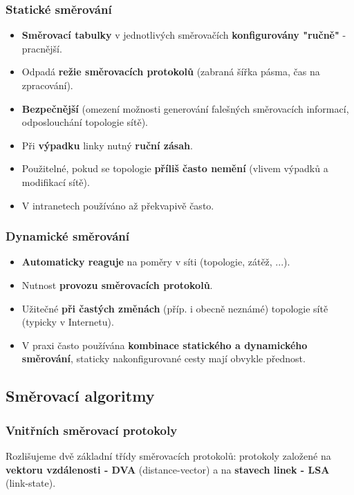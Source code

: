 \subsubsection*{Statické směrování}
\begin{itemize}
\item \textbf{Směrovací tabulky} v jednotlivých směrovačích \textbf{konfigurovány "ručně"} - pracnější.
\item Odpadá \textbf{režie směrovacích protokolů} (zabraná šířka pásma, čas na zpracování).
\item \textbf{Bezpečnější} (omezení možnosti generování falešných směrovacích informací, odposlouchání topologie sítě).
\item Při \textbf{výpadku} linky nutný \textbf{ruční zásah}.
\item Použitelné, pokud se topologie \textbf{příliš často nemění} (vlivem výpadků a modifikací sítě).
\item V intranetech používáno až překvapivě často.
\end{itemize}

\subsubsection*{Dynamické směrování}
\begin{itemize}
\item \textbf{Automaticky reaguje} na poměry v síti (topologie, zátěž, ...).
\item Nutnost\textbf{ provozu směrovacích protokolů}.
\item Užitečné \textbf{při častých změnách} (příp. i obecně neznámé) topologie sítě (typicky v Internetu).
\item V praxi často používána \textbf{kombinace statického a dynamického směrování}, staticky nakonfigurované cesty mají obvykle přednost.
\end{itemize}

\subsection*{Směrovací algoritmy}
\subsubsection*{Vnitřních směrovací protokoly}
Rozlišujeme dvě základní třídy směrovacích protokolů: protokoly založené na \textbf{vektoru vzdálenosti - DVA}  (distance-vector) a na \textbf{stavech linek - LSA	} (link-state). 

